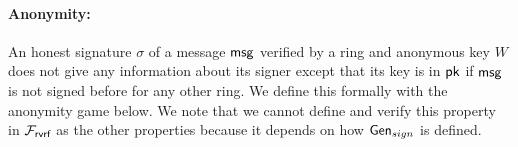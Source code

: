 

\paragraph{Anonymity:} An honest signature $ \sigma $ of a message $ \mathsf{msg} $ verified by a ring and anonymous key $ W $ does not give any information about its signer except that its key is in $ \mathsf{pk} $ if $ \mathsf{msg} $ is not signed before for any other ring. We define this formally with the anonymity game below. We note that we cannot define and verify this property in $ \mathcal{F}_{\textsf{rvrf}} $ as the other properties because it depends on how $ \mathsf{Gen}_{sign} $ is defined.

